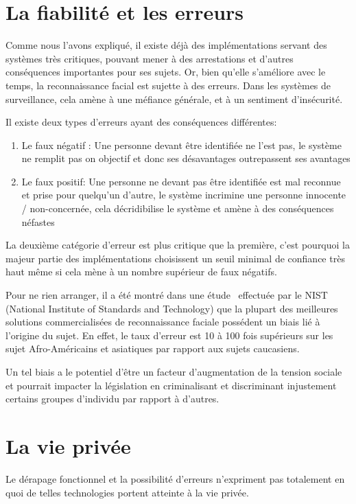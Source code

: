 \section{La fiabilité et les erreurs}
Comme nous l’avons expliqué, il existe déjà des implémentations servant des systèmes très critiques, pouvant
mener à des arrestations et d’autres conséquences importantes pour ses sujets. Or, bien qu’elle s’améliore avec le temps, la reconnaissance facial est sujette à des erreurs. Dans les systèmes de surveillance, cela amène à une
méfiance générale, et à un sentiment d’insécurité. 

Il existe deux types d’erreurs ayant des conséquences différentes:
\begin{enumerate}
\item Le faux négatif : Une personne devant être identifiée ne l’est pas, le système ne remplit pas on objectif et
donc ses désavantages outrepassent ses avantages
\item Le faux positif: Une personne ne devant pas être identifiée est mal reconnue et prise pour quelqu’un
d’autre, le système incrimine une personne innocente / non-concernée, cela décridibilise le système et
amène à des conséquences néfastes
\end{enumerate}

La deuxième catégorie d’erreur est plus critique que la première, c’est pourquoi la majeur partie des
implémentations choisissent un seuil minimal de confiance très haut même si cela mène à un nombre supérieur de
faux négatifs.

Pour ne rien arranger, il a été montré dans une étude~\cite{Grother2019} effectuée par le NIST (National Institute of Standards and
Technology) que la plupart des meilleures solutions commercialisées de reconnaissance faciale possédent un biais
lié à l’origine du sujet. En effet, le taux d’erreur est 10 à 100 fois supérieurs sur les sujet Afro-Américains et
asiatiques par rapport aux sujets caucasiens.

Un tel biais a le potentiel d’être un facteur d’augmentation de la tension sociale et pourrait impacter la législation
en criminalisant et discriminant injustement certains groupes d’individu par rapport à d’autres.

\section{La vie privée}
Le dérapage fonctionnel et la possibilité d’erreurs n'expriment pas totalement en quoi de telles technologies portent
atteinte à la vie privée.

